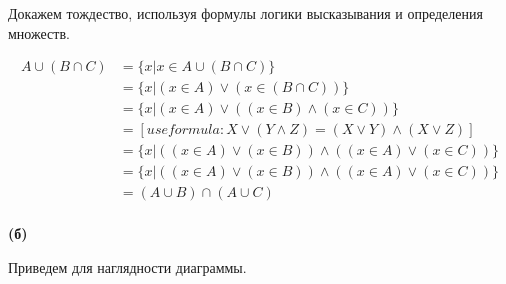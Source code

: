 \documentclass{article}
\begin{document}
Докажем тождество, используя формулы логики высказывания и определения множеств. 

\begin{equation} 
\begin{split}
A \cup (B \cap C) & = \{x | x \in A \cup (B \cap C) \} \\
 & = \{x | (x \in A) \vee (x \in (B \cap C)) \} \\
 & = \{x | (x \in A) \vee ( (x \in B) \wedge (x \in C)) \} \\
 & = [ use formula: X \vee (Y \wedge Z) = (X \vee Y) \wedge (X \vee Z)]  \\ 
 & = \{x | ((x \in A) \vee (x \in B)) \wedge ((x \in A) \vee (x \in C)) \} \\
 & = \{x | ((x \in A) \vee (x \in B)) \wedge ((x \in A) \vee (x \in C)) \} \\
 & = (A \cup B) \cap (A \cup C) \\
\end{split}
\end{equation}

\newpage

\textbf{(б)}

Приведем для наглядности диаграммы. 
\end{document}
